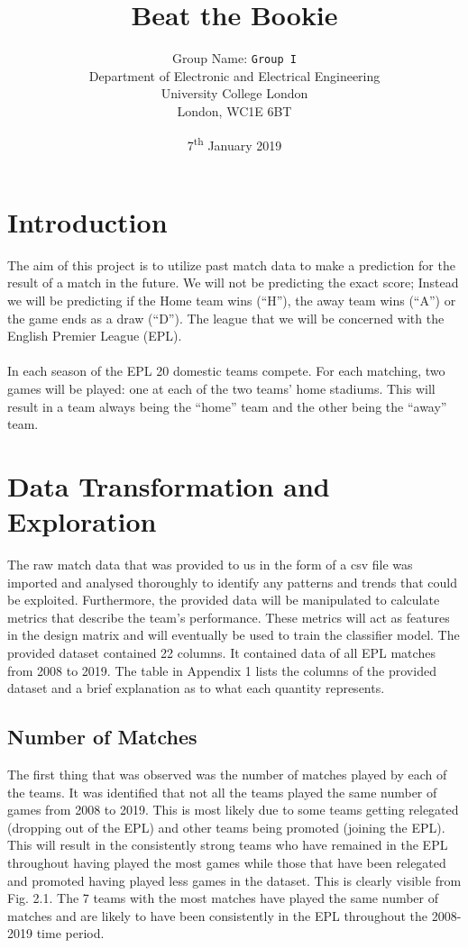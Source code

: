 \documentclass[a4paper,12pt]{article}
\title{Beat the Bookie}
\author
{
	Group Name: \texttt{Group I}\\
	Department of Electronic and Electrical Engineering\\
	University College London\\
	London, WC1E 6BT\\
}
\date{7\textsuperscript{th} January 2019}
\begin{document}
	
	\maketitle
	
	\section{Introduction}
	
	The aim of this project is to utilize past match data to make a prediction for the result of a match in the future. We will not be predicting the exact score; Instead we will be predicting if the Home team wins (“H”), the away team wins (“A”) or the game ends as a draw (“D”). The league that we will be concerned with the English Premier League (EPL).\\
	\\
	In each season of the EPL 20 domestic teams compete. For each matching, two games will be played: one at each of the two teams’ home stadiums. This will result in a team always being the “home” team and the other being the “away” team.  
	
	\section{Data Transformation and Exploration}
	
	The raw match data that was provided to us in the form of a csv file was imported and analysed thoroughly to identify any patterns and trends that could be exploited. Furthermore, the provided data will be manipulated to calculate metrics that describe the team’s performance. These metrics will act as features in the design matrix and will eventually be used to train the classifier model. The provided dataset contained 22 columns. It contained data of all EPL matches from 2008 to 2019. The table in Appendix 1 lists the columns of the provided dataset and a brief explanation as to what each quantity represents.
	
	\subsection{Number of Matches}
	
	The first thing that was observed was the number of matches played by each of the teams. It was identified that not all the teams played the same number of games from 2008 to 2019. This is most likely due to some teams getting relegated (dropping out of the EPL) and other teams being promoted (joining the EPL). This will result in the consistently strong teams who have remained in the EPL throughout having played the most games while those that have been relegated and promoted having played less games in the dataset. This is clearly visible from Fig. 2.1. The 7 teams with the most matches have played the same number of matches and are likely to have been consistently in the EPL throughout the 2008-2019 time period.  
	
\end{document}
